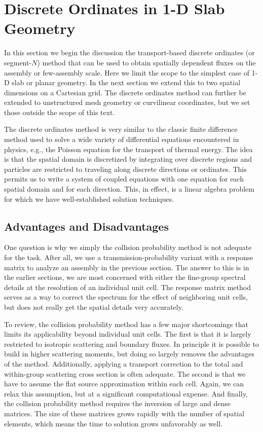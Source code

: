 \section{Discrete Ordinates in 1-D Slab Geometry}

In this section we begin the discussion the transport-based discrete ordinates (or segment-$N$) method that can be used to obtain spatially dependent fluxes on the assembly or few-assembly scale. Here we limit the scope to the simplest case of 1-D slab or planar geometry. In the next section we extend this to two spatial dimensions on a Cartesian grid.  The discrete ordinates method can further be extended to unstructured mesh geometry or curvilinear coordinates, but we set those outside the scope of this text.

The discrete ordinates method is very similar to the classic finite difference method used to solve a wide variety of differential equations encountered in physics, e.g., the Poisson equation for the transport of thermal energy. The idea is that the spatial domain is discretized by integrating over discrete regions and particles are restricted to traveling along discrete directions or ordinates. This permits us to write a system of coupled equations with one equation for each spatial domain and for each direction. This, in effect, is a linear algebra problem for which we have well-established solution techniques.

\subsection{Advantages and Disadvantages}

One question is why we simply the collision probability method is not adequate for the task. After all, we use a transmission-probability variant with a response matrix to analyze an assembly in the previous section. The answer to this is in the earlier sections, we are most concerned with either the fine-group spectral details at the resolution of an individual unit cell. The response matrix method serves as a way to correct the spectrum for the effect of neighboring unit cells, but does not really get the spatial details very accurately.

To review, the collision probability method has a few major shortcomings that limits its applicability beyond individual unit cells. The first is that it is largely restricted to isotropic scattering and boundary fluxes. In principle it is possible to build in higher scattering moments, but doing so largely removes the advantages of the method. Additionally, applying a transport correction to the total and within-group scattering cross section is often adequate. The second is that we have to assume the flat source approximation within each cell. Again, we can relax this assumption, but at a significant computational expense. And finally, the collision probability method requires the inversion of large and dense matrices. The size of these matrices grows rapidly with the number of spatial elements, which means the time to solution grows unfavorably as well.

